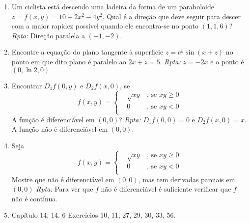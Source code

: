 \documentclass[11pt]{article}
\begin{document}
\begin{enumerate}
      \item Um ciclista está descendo uma ladeira da forma de um paraboloide 
      $z=f(x,y)=10-2x^{2}-4y^{2}$. Qual é a direção que deve seguir para descer com a maior rapidez possível quando ele encontra-se no ponto 
      $(1,1,6)$? {\it Rpta:} Direção paralela a $(-1,-2)$.     
      \item Encontre a equação do plano tangente à superficie 
      $z=e^{y}\sin(x+z)$ no ponto em que dito plano é paralelo ao 
      $2x+z=5$.  {\it Rpta:} $z=-2x$ e o ponto é $(0, \ln 2, 0)$    
     \item Encontrar $D_{1}f(0,y)$ e $D_{2}f(x,0)$, se 
        $$
    f(x,y)= \left\{  
            \begin{array}{lll}
    &\sqrt{xy} &\text{, se } xy \geq 0 \\
    & 0 &\text{, se } xy<0  \\
            \end{array}
            \right. 
    $$
    A função é diferenciável em $(0,0)$?
    {\it Rpta: } $D_{1}f(0,0)=0$ e  
     $D_{2}f(x,0)=x$. A função não é diferenciável em $(0,0)$.
     \item Seja
        $$
    f(x,y)= \left\{  
            \begin{array}{lll}
    &\sqrt{xy} &\text{, se } xy \geq 0 \\
    & 0 &\text{, se } xy<0  \\
            \end{array}
            \right. 
    $$
    Mostre que não é diferenciável em $(0,0)$, mas tem derivadas parciais em $(0,0)$
    {\it Rpta: } Para ver que $f$ não é diferenciável é suficiente verificar que $f$ não é contínua.  
    \item Capítulo 14, 14. 6 Exercícios 10, 11, 27, 29, 30, 33,  56. 
     \end{enumerate}  
   
\end{document}
